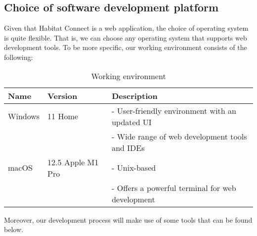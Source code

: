 \documentclass[conference]{IEEEtran}
\begin{document}
\subsection{Choice of software development platform}
Given that Habitat Connect is a web application, the choice of operating system is quite flexible. That is, we can choose any operating system that supports web development tools. To be more specific, our working environment consists of the following:
\begin{table}[H]
\centering
\begin{tabular}{|p{1cm}|l|p{4.2cm}|}
\hline
\textbf{Name} & \textbf{Version} & \textbf{Description}\\
\hline
Windows & 11 Home & 
- User-friendly environment with an updated UI \\
& & 
- Wide range of web development tools and IDEs \\
\hline
macOS & 12.5 Apple M1 Pro & 
- Unix-based \\
& & 
- Offers a powerful terminal for web development \\
\hline
\end{tabular}
\caption{Working environment}
\label{tab2}
\end{table}
Moreover, our development process will make use of some tools that can be found below.
\end{document}
